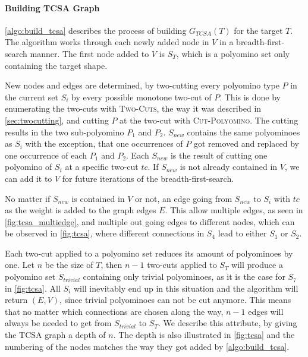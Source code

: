 \paragraph{Building TCSA Graph}

\autoref{algo:build_tcsa} describes the process of building $G_{TCSA}(T)$ for the target $T$.
The algorithm works through each newly added node in $V$ in a breadth-first-search manner.
The first node added to $V$ is $S_T$, which is a polyomino set only containing the target shape.

New nodes and edges are determined, by two-cutting every polyomino type $P$ in the current set $S_i$ by every possible monotone two-cut of $P$.
This is done by enumerating the two-cuts with {\scshape Two-Cuts}, the way it was described in \autoref{sec:twocutting}, and cutting $P$ at the two-cut with {\scshape Cut-Polyomino}.
The cutting results in the two sub-polyomino $P_1$ and $P_2$.
$S_{new}$ contains the same polyominoes as $S_i$ with the exception, that one occurrences of $P$ got removed and replaced by one occurrence of each $P_1$ and $P_2$.
Each $S_{new}$ is the result of cutting one polyomino of $S_i$ at a specific two-cut $tc$.
If $S_{new}$ is not already contained in $V$, we can add it to $V$ for future iterations of the breadth-first-search.

No matter if $S_{new}$ is contained in $V$ or not, an edge going from $S_{new}$ to $S_i$ with $tc$ as the weight is added to the graph edges $E$.
This allow multiple edges, as seen in \autoref{fig:tcsa_multiedge}, and multiple out going edges to different nodes, which can be observed in \autoref{fig:tcsa}, where different connections in $S_4$ lead to either $S_1$ or $S_2$.

Each two-cut applied to a polyomino set reduces its amount of polyominoes by one.
Let $n$ be the size of $T$, then $n-1$ two-cuts applied to $S_T$ will produce a polyomino set $S_{trivial}$ containing only trivial polyominoes, as it is the case for $S_7$ in \autoref{fig:tcsa}.
All $S_i$ will inevitably end up in this situation and the algorithm will return $(E,V)$, since trivial polyominoes can not be cut anymore.
This means that no matter which connections are chosen along the way, $n-1$ edges will always be needed to get from $S_{trivial}$ to $S_T$.
We describe this attribute, by giving the TCSA graph a depth of $n$.
The depth is also illustrated in \autoref{fig:tcsa} and the numbering of the nodes matches the way they got added by \autoref{algo:build_tcsa}.

